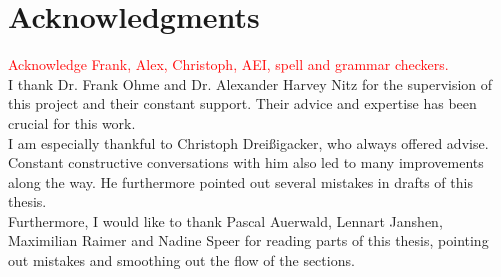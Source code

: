 \section{Acknowledgments}
\textcolor{red}{Acknowledge Frank, Alex, Christoph, AEI, spell and grammar checkers.}\\
I thank Dr. Frank Ohme and Dr. Alexander Harvey Nitz for the supervision of this project and their constant support. Their advice and expertise has been crucial for this work.\\
I am especially thankful to Christoph Dreißigacker, who always offered advise. Constant constructive conversations with him also led to many improvements along the way. He furthermore pointed out several mistakes in drafts of this thesis.\\
Furthermore, I would like to thank Pascal Auerwald, Lennart Janshen, Maximilian Raimer and Nadine Speer for reading parts of this thesis, pointing out mistakes and smoothing out the flow of the sections.